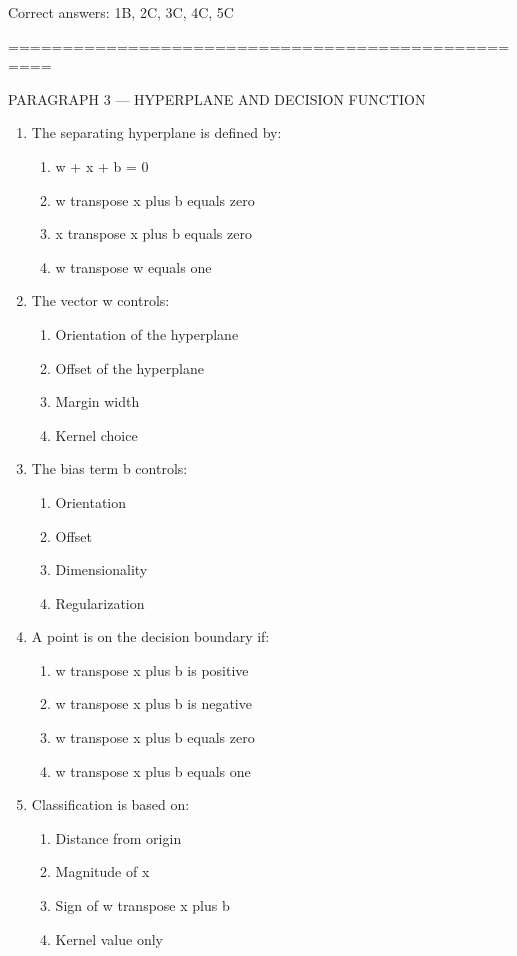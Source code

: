 \documentclass{article}
\begin{document}
	Correct answers: 1B, 2C, 3C, 4C, 5C
	
	\bigskip
	==================================================
	
	PARAGRAPH 3 — HYPERPLANE AND DECISION FUNCTION
	
	\begin{enumerate}
		\item The separating hyperplane is defined by:
		\begin{enumerate}
			\item w + x + b = 0
			\item w transpose x plus b equals zero
			\item x transpose x plus b equals zero
			\item w transpose w equals one
		\end{enumerate}
		
		\item The vector w controls:
		\begin{enumerate}
			\item Orientation of the hyperplane
			\item Offset of the hyperplane
			\item Margin width
			\item Kernel choice
		\end{enumerate}
		
		\item The bias term b controls:
		\begin{enumerate}
			\item Orientation
			\item Offset
			\item Dimensionality
			\item Regularization
		\end{enumerate}
		
		\item A point is on the decision boundary if:
		\begin{enumerate}
			\item w transpose x plus b is positive
			\item w transpose x plus b is negative
			\item w transpose x plus b equals zero
			\item w transpose x plus b equals one
		\end{enumerate}
		
		\item Classification is based on:
		\begin{enumerate}
			\item Distance from origin
			\item Magnitude of x
			\item Sign of w transpose x plus b
			\item Kernel value only
		\end{enumerate}
	\end{enumerate}
	
\end{document}
